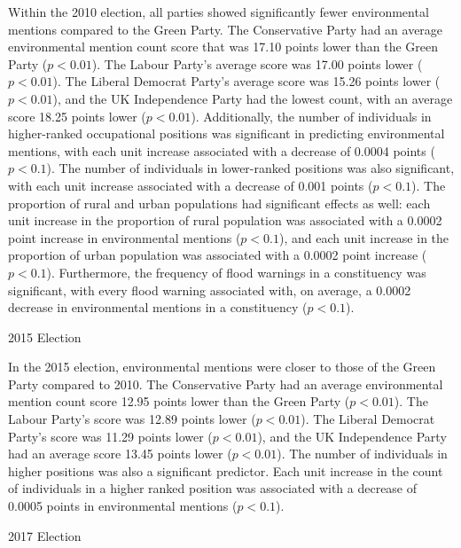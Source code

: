\documentclass[12pt,letterpaper]{article}
\begin{document}
Within the 2010 election, all parties showed significantly fewer environmental mentions compared to the Green Party. The Conservative Party had an average environmental mention count score that was 17.10 points lower than the Green Party ($p<0.01$). The Labour Party's average score was 17.00 points lower ($p<0.01$). The Liberal Democrat Party's average score was 15.26 points lower ($p<0.01$), and the UK Independence Party had the lowest count, with an average score 18.25 points lower ($p<0.01$). Additionally, the number of individuals in higher-ranked occupational positions was significant in predicting environmental mentions, with each unit increase associated with a decrease of 0.0004 points ($p<0.1$). The number of individuals in lower-ranked positions was also significant, with each unit increase associated with a decrease of 0.001 points ($p<0.1$). The proportion of rural and urban populations had significant effects as well: each unit increase in the proportion of rural population was associated with a 0.0002 point increase in environmental mentions ($p<0.1$), and each unit increase in the proportion of urban population was associated with a 0.0002 point increase ($p<0.1$). Furthermore, the frequency of flood warnings in a constituency was significant, with every flood warning associated with, on average, a 0.0002 decrease in environmental mentions in a constituency ($p < 0.1$).

2015 Election

In the 2015 election, environmental mentions were closer to those of the Green Party compared to 2010. The Conservative Party had an average environmental mention count score 12.95 points lower than the Green Party ($p<0.01$). The Labour Party's score was 12.89 points lower ($p<0.01$). The Liberal Democrat Party's score was 11.29 points lower ($p<0.01$), and the UK Independence Party had an average score 13.45 points lower ($p<0.01$). The number of individuals in higher positions was also a significant predictor. Each unit increase in the count of individuals in a higher ranked position was associated with a decrease of 0.0005 points in environmental mentions ($p<0.1$).

2017 Election
\end{document}
